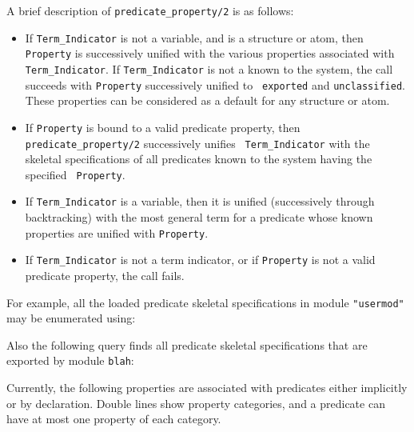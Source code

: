 \begin{description}
    A brief description of {\tt predicate\_property/2} is as follows:
    \begin{itemize} 
\item If {\tt Term\_Indicator} is not a variable, and is a structure
	or atom, then {\tt Property} is successively unified with the
	various properties associated with {\tt Term\_Indicator}.  If
	{\tt Term\_Indicator} is not a known to the system, the call
	succeeds with {\tt Property} successively unified to {\tt
	exported} and {\tt unclassified}.  These properties can be
	considered as a default for any structure or atom.
\item If {\tt Property} is bound to a valid predicate property, then {\tt
	predicate\_property/2} successively unifies {\tt
	Term\_Indicator} with the skeletal specifications of all
	predicates known to the system having the specified {\tt
	Property}.  
\item If {\tt Term\_Indicator} is a variable, then
	it is unified (successively through backtracking) with the
	most general term for a predicate whose known properties are
	unified with {\tt Property}.  
\item If {\tt Term\_Indicator}
	is not a term indicator, or if {\tt Property} is not a valid
	predicate property, the call fails.  
\end{itemize} 
\noindent
For example, all the loaded predicate skeletal specifications in
module {\tt "usermod"} may be enumerated using:


    Also the following query finds all predicate skeletal specifications that 
    are exported by module {\tt blah}:


    Currently, the following properties are associated with predicates 
    either implicitly or by declaration.  Double lines show property
    categories, and a predicate can have at most one property of each
    category.


\end{description}
